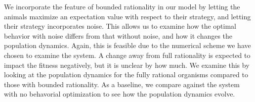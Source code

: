 We incorporate the feature of bounded rationality in our model by letting the animals maximize an expectation value with respect to their strategy, and letting their strategy incorporates noise. This allows us to examine how the optimal behavior with noise differs from that without noise, and how it changes the population dynamics. Again, this is feasible due to the numerical scheme we have chosen to examine the system. A change away from full rationality is expected to impact the fitness negatively, but it is unclear by how much. We examine this by looking at the population dynamics for the fully rational organisms compared to those with bounded rationality. As a baseline, we compare against the system with no behavorial optimization to see how the population dynamics evolve.




